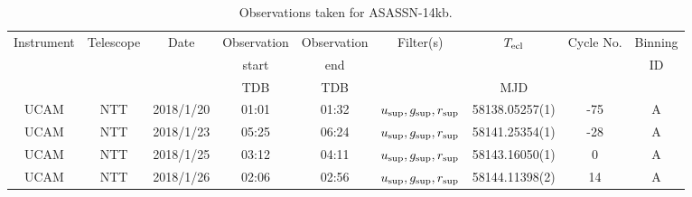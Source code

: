\begin{table}
	\begin{center}
		\caption{Observations taken for ASASSN-14kb.}
		\label{table:observing:observation logs ASASSN-14kb}
		\begin{tabular}{ccccccccc}
			\hline
			Instrument & Telescope & Date & Observation  & Observation  & Filter(s) & $T_{\rm ecl}$ & Cycle No. & Binning \\
			 &  &  &  start &  end &  &  &  & ID \\
			 &  &  & TDB & TDB &  & MJD &  &  \\
			\hline
			\hline
			UCAM & NTT & 2018/1/20 & 01:01 & 01:32 & $u_{\rm sup},g_{\rm sup},r_{\rm sup}$ & 58138.05257(1) & -75 & A \\
			UCAM & NTT & 2018/1/23 & 05:25 & 06:24 & $u_{\rm sup},g_{\rm sup},r_{\rm sup}$ & 58141.25354(1) & -28 & A \\
			UCAM & NTT & 2018/1/25 & 03:12 & 04:11 & $u_{\rm sup},g_{\rm sup},r_{\rm sup}$ & 58143.16050(1) &   0 & A \\
			UCAM & NTT & 2018/1/26 & 02:06 & 02:56 & $u_{\rm sup},g_{\rm sup},r_{\rm sup}$ & 58144.11398(2) &  14 & A \\
		   \hline
		\end{tabular}
	\end{center}
\end{table}